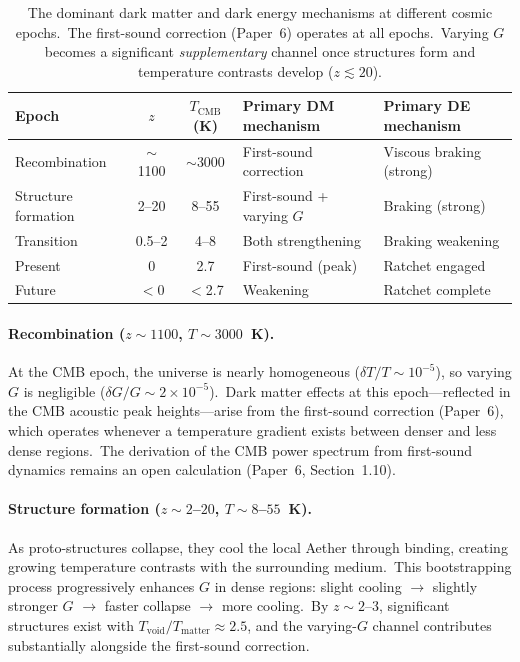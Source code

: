 \documentclass[12pt,letterpaper]{article}
\begin{document}
\begin{table}[h]
\centering
\begin{tabular}{@{}lccll@{}}
\toprule
Epoch & $z$ & $T_{\mathrm{CMB}}$ (K) &
  Primary DM mechanism & Primary DE mechanism \\
\midrule
Recombination & $\sim$1100 & $\sim$3000 & First-sound correction & Viscous braking (strong) \\
Structure formation & 2--20 & 8--55 & First-sound + varying $G$ & Braking (strong) \\
Transition & 0.5--2 & 4--8  & Both strengthening & Braking weakening \\
Present & 0 & 2.7 & First-sound (peak) & Ratchet engaged \\
Future & $<$0 & $<$2.7 & Weakening & Ratchet complete \\
\bottomrule
\end{tabular}
\caption{The dominant dark matter and dark energy mechanisms at different
  cosmic epochs.\ The first-sound correction (Paper~6) operates at all
  epochs.\ Varying $G$ becomes a significant \emph{supplementary} channel
  once structures form and temperature contrasts develop ($z \lesssim 20$).}
\label{tab:handoff}
\end{table}

\paragraph{Recombination ($z \sim 1100$, $T \sim 3000$~K).}
At the CMB epoch, the universe is nearly homogeneous ($\delta T/T \sim 10^{-5}$),
so varying $G$ is negligible ($\delta G/G \sim 2 \times 10^{-5}$).\ Dark matter
effects at this epoch---reflected in the CMB acoustic peak heights---arise from
the first-sound correction (Paper~6), which operates whenever a temperature
gradient exists between denser and less dense regions.\ The derivation of the
CMB power spectrum from first-sound dynamics remains an open calculation
(Paper~6, Section~1.10).

\paragraph{Structure formation ($z \sim 2$--$20$, $T \sim 8$--$55$~K).}
As proto-structures collapse, they cool the local Aether through binding,
creating growing temperature contrasts with the surrounding medium.\ This
bootstrapping process progressively enhances $G$ in dense regions: slight
cooling $\to$ slightly stronger $G$ $\to$ faster collapse $\to$ more cooling.\
By $z \sim 2$--$3$, significant structures exist with $T_{\mathrm{void}}/
T_{\mathrm{matter}} \approx 2.5$, and the varying-$G$ channel contributes
substantially alongside the first-sound correction.
\end{document}
